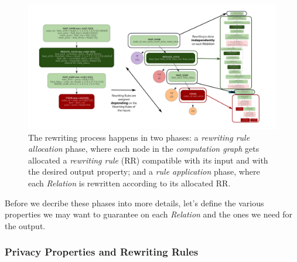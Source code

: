 \documentclass{article}
\begin{document}
    \begin{figure}[t]
        \centering
        \includegraphics[width=\textwidth]{figures/rewriting} %
        \caption{The rewriting process happens in two phases: a \emph{rewriting rule allocation} phase, where each node in the \emph{computation graph} gets allocated a \emph{rewriting rule} (RR) compatible with its input and with the desired output property; and a \emph{rule application} phase, where each \emph{Relation} is rewritten according to its allocated RR.}
        \label{fig:rewriting}
    \end{figure}
    
    Before we decribe these phases into more details, let's define the various properties we may want to guarantee on each \emph{Relation} and the ones we need for the output.
    
    \subsubsection{Privacy Properties and Rewriting Rules}
    \label{sec:privacy_properties}
    
\end{document}
